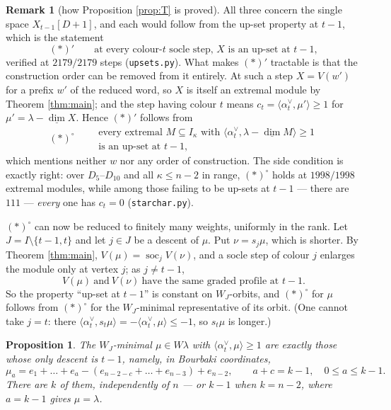 \documentclass[11pt,reqno]{amsart}
\theoremstyle{plain}
\newtheorem{proposition}[theorem]{Proposition}
\theoremstyle{definition}
\newtheorem{remark}[theorem]{Remark}
\DeclareMathOperator{\soc}{soc}
\newcommand{\dimv}{\underline{\dim}}
\newcommand{\al}{\alpha}
\newcommand{\la}{\lambda}
\newcommand{\ka}{\kappa}
\begin{document}
\begin{remark}[how Proposition \ref{prop:T} is proved]
All three concern the single space $X_{t-1}[D+1]$, and each would follow from
the up-set property at $t-1$, which is the statement
\[
   (*)'\qquad \text{at every colour-$t$ socle step, } X \text{ is an up-set at }
   t-1 ,
\]
verified at $2179/2179$ steps (\texttt{upsets.py}).  What makes $(*)'$
tractable is that the construction order can be removed from it entirely.  At
such a step $X=V(w')$ for a prefix $w'$ of the reduced word, so $X$ is itself
an extremal module by Theorem \ref{thm:main}; and the step having colour $t$
means $c_t=\langle\al_t^\vee,\mu'\rangle\ge1$ for $\mu'=\la-\dimv X$.  Hence
$(*)'$ follows from
\[
   (*)^{\circ}\qquad
   \begin{array}{l}
   \text{every extremal } M\subseteq I_\ka \text{ with }
   \langle\al_t^\vee,\la-\dimv M\rangle\ge1\\
   \text{is an up-set at } t-1 ,
   \end{array}
\]
which mentions neither $w$ nor any order of construction.  The side condition
is exactly right: over $D_5$--$D_{10}$ and all $\ka\le n-2$ in range,
$(*)^{\circ}$ holds at $1998/1998$ extremal modules, while among those failing
to be up-sets at $t-1$ --- there are $111$ --- \emph{every} one has
$c_t=0$ (\texttt{starchar.py}).

$(*)^{\circ}$ can now be reduced to finitely many weights, uniformly in the
rank.  Let $J=I\setminus\{t-1,t\}$ and let $j\in J$ be a descent of $\mu$.  Put
$\nu=s_j\mu$, which is shorter.  By Theorem \ref{thm:main}, $V(\mu)=\soc_j
V(\nu)$, and a socle step of colour $j$ enlarges the module only at vertex $j$;
as $j\ne t-1$,
\[
   V(\mu)\ \text{and}\ V(\nu)\ \text{have the same graded profile at } t-1 .
\]
So the property ``up-set at $t-1$'' is constant on $W_J$-orbits, and
$(*)^{\circ}$ for $\mu$ follows from $(*)^{\circ}$ for the $W_J$-minimal
representative of its orbit.  (One cannot take $j=t$: there
$\langle\al_t^\vee,s_t\mu\rangle=-\langle\al_t^\vee,\mu\rangle\le-1$, so $s_t\mu$
is longer.)

\begin{proposition}\label{prop:reps}
The $W_J$-minimal $\mu\in W\la$ with $\langle\al_t^\vee,\mu\rangle\ge1$ are
exactly those whose only descent is $t-1$, namely, in Bourbaki coordinates,
\[
   \mu_a=e_1+\dots+e_a-(e_{n-2-c}+\dots+e_{n-3})+e_{n-2},
   \qquad a+c=k-1,\quad 0\le a\le k-1 .
\]
There are $k$ of them, independently of $n$ --- or $k-1$ when $k=n-2$, where
$a=k-1$ gives $\mu=\la$.
\end{proposition}


\end{remark}
\end{document}
